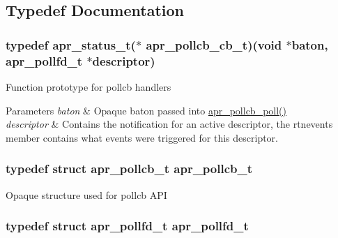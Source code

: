 \subsection{Typedef Documentation}
\hypertarget{group__apr__poll_gad440412b52e12fcfddfdd5b1618359e5}{
\subsubsection[{apr\-\_\-pollcb\-\_\-cb\-\_\-t}]{\setlength{\rightskip}{0pt plus 5cm}typedef {\bf apr\-\_\-status\-\_\-t}($\ast$ apr\-\_\-pollcb\-\_\-cb\-\_\-t)(void $\ast$baton, {\bf apr\-\_\-pollfd\-\_\-t} $\ast$descriptor)}}\label{group__apr__poll_gad440412b52e12fcfddfdd5b1618359e5}
Function prototype for pollcb handlers 
\begin{DoxyParams}{Parameters}
{\em baton} & Opaque baton passed into \hyperlink{group__apr__poll_ga11765d1b27e2f621a8dcd2c40f0e259c}{apr\-\_\-pollcb\-\_\-poll()} \\
\hline
{\em descriptor} & Contains the notification for an active descriptor, the rtnevents member contains what events were triggered for this descriptor. \\
\hline
\end{DoxyParams}
\hypertarget{group__apr__poll_gae382e39bdf0c5a02fca7da3944bece08}{
\subsubsection[{apr\-\_\-pollcb\-\_\-t}]{\setlength{\rightskip}{0pt plus 5cm}typedef struct {\bf apr\-\_\-pollcb\-\_\-t} {\bf apr\-\_\-pollcb\-\_\-t}}}\label{group__apr__poll_gae382e39bdf0c5a02fca7da3944bece08}
Opaque structure used for pollcb A\-P\-I \hypertarget{group__apr__poll_ga0c89b184cbe2337e44207f1ad245129b}{
\subsubsection[{apr\-\_\-pollfd\-\_\-t}]{\setlength{\rightskip}{0pt plus 5cm}typedef struct {\bf apr\-\_\-pollfd\-\_\-t} {\bf apr\-\_\-pollfd\-\_\-t}}}\label{group__apr__poll_ga0c89b184cbe2337e44207f1ad245129b}
